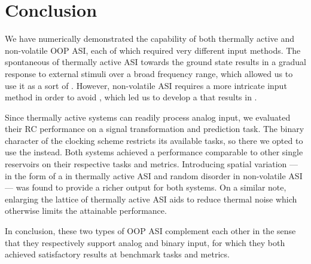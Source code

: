 \section{Conclusion}
We have numerically demonstrated the  capability of both thermally active and non-volatile OOP ASI, each of which required very different input methods.
The spontaneous  of thermally active ASI towards the ground state results in a gradual response to external stimuli over a broad frequency range, which allowed us to use it as a sort of .
However, non-volatile ASI requires a more intricate input method in order to avoid , which led us to develop a  that results in . \par
Since thermally active systems can readily process analog input, we evaluated their RC performance on a signal transformation and prediction task.
The binary character of the clocking scheme restricts its available tasks, so there we opted to use the  instead.
Both systems achieved a performance comparable to other single reservoirs on their respective tasks and metrics.
Introducing spatial variation --- in the form of a  in thermally active ASI and random disorder in non-volatile ASI --- was found to provide a richer output for both systems.
On a similar note, enlarging the lattice of thermally active ASI aids to reduce thermal noise which otherwise limits the attainable performance. \par
In conclusion, these two types of OOP ASI complement each other in the sense that they respectively support analog and binary input, for which they both achieved satisfactory results at benchmark tasks and metrics.
